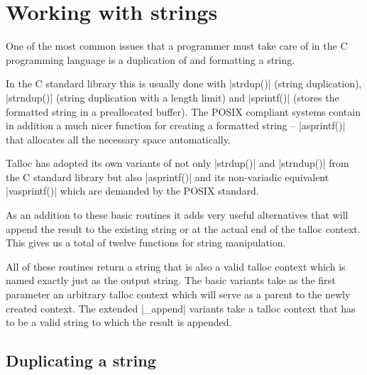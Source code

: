 \section{Working with strings}
\label{talloc:sec:strings}

One of the most common issues that a programmer must take care of in the C
programming language is a duplication of and formatting a string.

In the C standard library this is usually done with |strdup()| (string
duplication), |strndup()| (string duplication with a length limit) and
|sprintf()| (stores the formatted string in a preallocated buffer). The POSIX
compliant systems contain in addition a much nicer function for creating a
formatted string -- |asprintf()| that allocates all the necessary space
automatically.

Talloc has adopted its own variants of not only |strdup()| and |strndup()| from
the C standard library but also |asprintf()| and its non-variadic
equivalent |vasprintf()| which are demanded by the POSIX standard.

As an addition to these basic routines it adds very useful alternatives that
will append the result to the existing string or at the actual end of the talloc
context. This gives us a total of twelve functions for string manipulation.

All of these routines return a string that is also a valid talloc context
which is named exactly just as the output string. The basic variants take as
the first parameter an arbitrary talloc context which will serve as a parent to
the newly created context. The extended |_append| variants take a talloc context
that has to be a valid string to which the result is appended.

\subsection{Duplicating a string}

